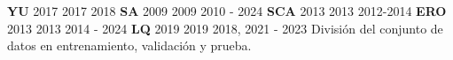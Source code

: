 \documentclass[letterpaper,12pt, twoside]{report}
\providecommand{\DIFdeltex}[1]{{\protect\color{red} \scriptsize #1}} %
\providecommand{\DIFdelFL}[1]{\DIFdel{#1}} %
\providecommand{\DIFdel}[1]{\texorpdfstring{\DIFdeltex{#1}}{}} %
\begin{document}
\DIFdelFL{\textbf{YU}  }%
\DIFdelFL{2017 }%
\DIFdelFL{2017 }%
\DIFdelFL{2018 }%
\DIFdelFL{\textbf{SA}  }%
\DIFdelFL{2009 }%
\DIFdelFL{2009 }%
\DIFdelFL{2010 - 2024 }%
\DIFdelFL{\textbf{SCA} }%
\DIFdelFL{2013 }%
\DIFdelFL{2013 }%
\DIFdelFL{2012-2014 }%
\DIFdelFL{\textbf{ERO} }%
\DIFdelFL{2013 }%
\DIFdelFL{2013 }%
\DIFdelFL{2014 - 2024  }%
\DIFdelFL{\textbf{LQ}  }%
\DIFdelFL{2019 }%
\DIFdelFL{2019 }%
\DIFdelFL{2018, 2021 - 2023  }%
{%
\DIFdelFL{División del conjunto de datos en entrenamiento, validación y prueba.}}
\end{document}
